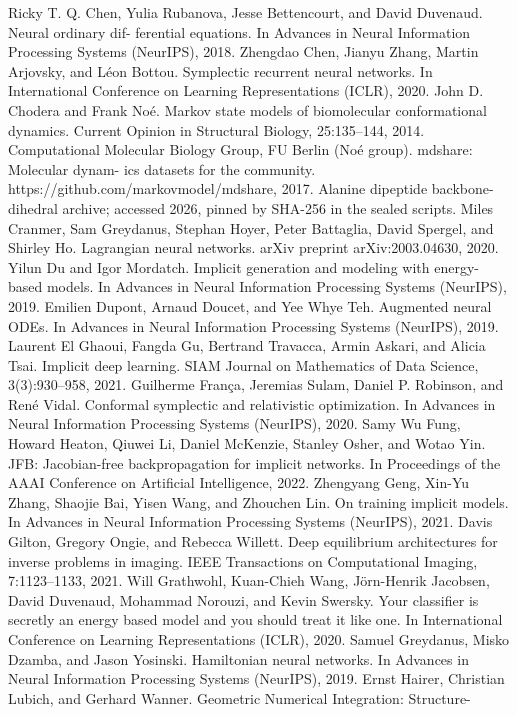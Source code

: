 \documentclass{article}
\begin{document}
Ricky T. Q. Chen, Yulia Rubanova, Jesse Bettencourt, and David Duvenaud. Neural ordinary dif-
ferential equations. In Advances in Neural Information Processing Systems (NeurIPS), 2018.
Zhengdao Chen, Jianyu Zhang, Martin Arjovsky, and L\'eon Bottou. Symplectic recurrent neural
networks. In International Conference on Learning Representations (ICLR), 2020.
John D. Chodera and Frank No\'e. Markov state models of biomolecular conformational dynamics.
Current Opinion in Structural Biology, 25:135--144, 2014.
Computational Molecular Biology Group, FU Berlin (No\'e group). mdshare: Molecular dynam-
ics datasets for the community. https://github.com/markovmodel/mdshare, 2017.
Alanine dipeptide backbone-dihedral archive; accessed 2026, pinned by SHA-256 in the sealed
scripts.
Miles Cranmer, Sam Greydanus, Stephan Hoyer, Peter Battaglia, David Spergel, and Shirley Ho.
Lagrangian neural networks. arXiv preprint arXiv:2003.04630, 2020.
Yilun Du and Igor Mordatch. Implicit generation and modeling with energy-based models. In
Advances in Neural Information Processing Systems (NeurIPS), 2019.
Emilien Dupont, Arnaud Doucet, and Yee Whye Teh. Augmented neural ODEs. In Advances in
Neural Information Processing Systems (NeurIPS), 2019.
Laurent El Ghaoui, Fangda Gu, Bertrand Travacca, Armin Askari, and Alicia Tsai. Implicit deep
learning. SIAM Journal on Mathematics of Data Science, 3(3):930--958, 2021.
Guilherme Fran\c{c}a, Jeremias Sulam, Daniel P. Robinson, and Ren\'e Vidal. Conformal symplectic
and relativistic optimization. In Advances in Neural Information Processing Systems (NeurIPS),
2020.
Samy Wu Fung, Howard Heaton, Qiuwei Li, Daniel McKenzie, Stanley Osher, and Wotao Yin. JFB:
Jacobian-free backpropagation for implicit networks. In Proceedings of the AAAI Conference on
Artificial Intelligence, 2022.
Zhengyang Geng, Xin-Yu Zhang, Shaojie Bai, Yisen Wang, and Zhouchen Lin. On training implicit
models. In Advances in Neural Information Processing Systems (NeurIPS), 2021.
Davis Gilton, Gregory Ongie, and Rebecca Willett.
Deep equilibrium architectures for inverse
problems in imaging. IEEE Transactions on Computational Imaging, 7:1123--1133, 2021.
Will Grathwohl, Kuan-Chieh Wang, J\"orn-Henrik Jacobsen, David Duvenaud, Mohammad Norouzi,
and Kevin Swersky. Your classifier is secretly an energy based model and you should treat it like
one. In International Conference on Learning Representations (ICLR), 2020.
Samuel Greydanus, Misko Dzamba, and Jason Yosinski. Hamiltonian neural networks. In Advances
in Neural Information Processing Systems (NeurIPS), 2019.
Ernst Hairer, Christian Lubich, and Gerhard Wanner. Geometric Numerical Integration: Structure-
\end{document}
